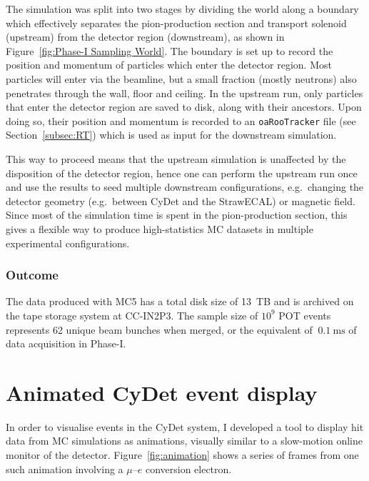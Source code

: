 The simulation was split into two stages by dividing the world along a boundary
which effectively separates the pion-production section and transport solenoid
(upstream) from the detector region (downstream), as shown in
Figure~\ref{fig:Phase-I Sampling World}. The boundary is set up to record the
position and momentum of particles which enter the detector region. Most
particles will enter via the beamline, but a small fraction (mostly neutrons)
also penetrates through the wall, floor and ceiling. In the upstream run, only
particles that enter the detector region are saved to disk, along with their
ancestors. Upon doing so, their position and momentum is recorded to an
\texttt{oaRooTracker} file (see Section~\ref{subsec:RT}) which is used as input for the
downstream simulation.

This way to proceed means that the upstream simulation is unaffected by the disposition of the detector region, hence one can perform the upstream run once and use the results to seed multiple downstream configurations, e.g.\ changing the detector geometry (e.g.\ between CyDet and the StrawECAL) or magnetic field. Since most of the simulation time is spent in the pion-production section, this gives a flexible way to produce high-statistics MC datasets in multiple experimental configurations.

\subsubsection{Outcome}
The data produced with MC5 has a total disk size of \SI{13}{TB} and is archived on the tape storage system at CC-IN2P3. The sample size of $10^9$ POT events represents 62 unique beam bunches when merged, or the equivalent of $~\SI{0.1}{\ms}$ of data acquisition in Phase-I.

\section{Animated CyDet event display}
In order to visualise events in the CyDet system, I developed a tool to display hit data from MC simulations as animations, visually similar to a slow-motion online monitor of the detector. Figure~\ref{fig:animation} shows a series of frames from one such animation involving a $\mu$--$e$ conversion electron.

